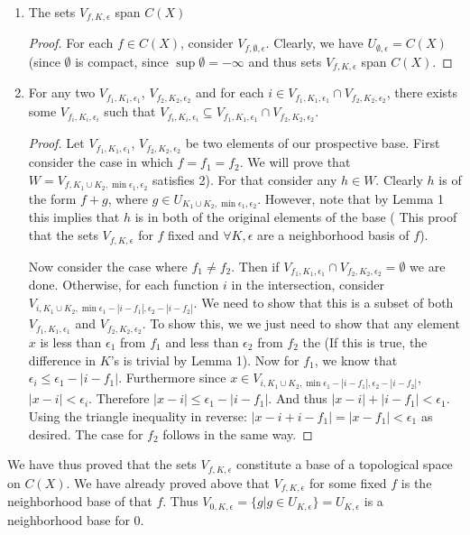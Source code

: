 \begin{enumerate}
\item The sets $V_{f,K,\epsilon}$ span $C(X)$
\begin{proof}
For each $f\in C(X)$, consider $V_{f,\emptyset,\epsilon}$. Clearly, we have $U_{\emptyset,\epsilon} = C(X)$ (since $\emptyset$ is compact, since $\sup \emptyset = -\infty$ and thus sets $V_{f,K,\epsilon}$ span $C(X)$.
\end{proof}
\item For any two $V_{f_1,K_1,\epsilon_1}$, $V_{f_2,K_2,\epsilon_2}$ and for each $i\in V_{f_1,K_1,\epsilon_1} \cap V_{f_2,K_2,\epsilon_2}$, there exists some $V_{f_i,K_i,\epsilon_i}$ such that $V_{f_i,K_i,\epsilon_i} \subseteq V_{f_1,K_1,\epsilon_1} \cap V_{f_2,K_2,\epsilon_2}$.
\begin{proof}
Let $V_{f_1,K_1,\epsilon_1}$, $V_{f_2,K_2,\epsilon_2}$ be two elements of our prospective base. First consider the case in which 
$f=f_1=f_2$. We will prove that $W=V_{f,K_1\cup K_2,\min \epsilon_1,\epsilon_2}$ satisfies 2). For that consider any $h\in W$. Clearly $h$ is of the form $f+g$, where $g\in U_{K_1\cup K_2,\min \epsilon_1,\epsilon_2}$. However, note that by Lemma 1 this implies that $h$ is in both of the original elements of the base ( This proof that the sets $V_{f,K,\epsilon}$ for $f$ fixed and $\forall K, \epsilon$ are a neighborhood basis of $f$). \par
Now consider the case where $f_1\neq f_2$. Then if $V_{f_1,K_1,\epsilon_1} \cap V_{f_2,K_2,\epsilon_2} = \emptyset$ we are done. Otherwise, for each function $i$ in the intersection, consider 
$V_{i,K_1\cup K_2, \min \epsilon_1-|i-f_1|,\epsilon_2-|i-f_2|}$. We need to show that this is a subset of both $V_{f_1,K_1,\epsilon_1}$ and $V_{f_2,K_2,\epsilon_2}$. To show this, we we just need to show that any element $x$ is less than $\epsilon_1$ from $f_1$ and less than $\epsilon_2$ from $f_2$ the (If this is true, the difference in $K$'s is trivial by Lemma 1). Now for $f_1$, we know that $\epsilon_i \leq \epsilon_1-|i-f_1|$.
 Furthermore since $x\in V_{i,K_1\cup K_2, \min \epsilon_1-|i-f_1|,\epsilon_2-|i-f_2|}$, $|x-i|<\epsilon_i$. Therefore $|x-i| \leq \epsilon_1-|i-f_1|$. And thus $|x-i|+|i-f_1|<\epsilon_1$. Using the triangle inequality in reverse: $|x-i+i-f_1|=|x-f_1|<\epsilon_1$ as desired. The case for $f_2$ follows in the same way.
\end{proof}
\end{enumerate}
We have thus proved that the sets $V_{f,K,\epsilon}$ constitute a base of a topological space on $C(X)$.  We have already proved above that $V_{f,K,\epsilon}$ for some fixed $f$ is the neighborhood base of that $f$. Thus $V_{0,K,\epsilon} =\{g | g\in U_{K,\epsilon} \} = U_{K,\epsilon}$ is a neighborhood base for $0$. 
